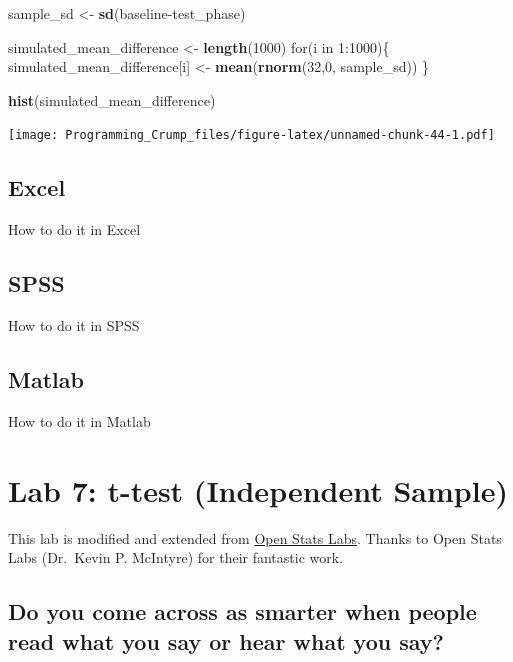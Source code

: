 \documentclass[]{book}
\newenvironment{Shaded}{\begin{snugshade}}{\end{snugshade}}
\newcommand{\KeywordTok}[1]{\textcolor[rgb]{0.13,0.29,0.53}{\textbf{{#1}}}}
\newcommand{\DecValTok}[1]{\textcolor[rgb]{0.00,0.00,0.81}{{#1}}}
\newcommand{\StringTok}[1]{\textcolor[rgb]{0.31,0.60,0.02}{{#1}}}
\newcommand{\NormalTok}[1]{{#1}}
\theoremstyle{definition}
\theoremstyle{definition}
\theoremstyle{definition}
\theoremstyle{remark}
\begin{document}
\begin{Shaded}
\begin{Highlighting}[]
\NormalTok{sample_sd   <-}\StringTok{ }\KeywordTok{sd}\NormalTok{(baseline-test_phase)}

\NormalTok{simulated_mean_difference <-}\StringTok{ }\KeywordTok{length}\NormalTok{(}\DecValTok{1000}\NormalTok{)}
\NormalTok{for(i in }\DecValTok{1}\NormalTok{:}\DecValTok{1000}\NormalTok{)\{}
 \NormalTok{simulated_mean_difference[i] <-}\StringTok{ }\KeywordTok{mean}\NormalTok{(}\KeywordTok{rnorm}\NormalTok{(}\DecValTok{32}\NormalTok{,}\DecValTok{0}\NormalTok{, sample_sd))}
\NormalTok{\}}

\KeywordTok{hist}\NormalTok{(simulated_mean_difference)}
\end{Highlighting}
\end{Shaded}

\texttt{[image: Programming\_Crump\_files/figure-latex/unnamed-chunk-44-1.pdf]}

\section{Excel}\label{excel-5}

How to do it in Excel

\section{SPSS}\label{spss-5}

How to do it in SPSS

\section{Matlab}\label{matlab-5}

How to do it in Matlab

\chapter{Lab 7: t-test (Independent
Sample)}\label{lab-7-t-test-independent-sample}

This lab is modified and extended from
\href{https://sites.trinity.edu/osl}{Open Stats Labs}. Thanks to Open
Stats Labs (Dr.~Kevin P. McIntyre) for their fantastic work.

\section{Do you come across as smarter when people read what you say or
hear what you
say?}\label{do-you-come-across-as-smarter-when-people-read-what-you-say-or-hear-what-you-say}
\end{document}
